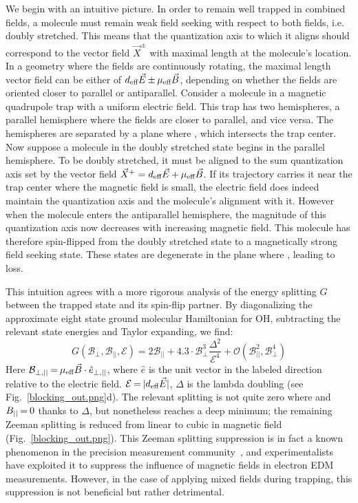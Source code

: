 \documentclass[defaultstyle,11pt]{thesis}
\begin{document}
We begin with an intuitive picture.
In order to remain well trapped in combined fields, a molecule must remain weak field seeking with respect to both fields, i.e. doubly stretched.
This means that the quantization axis to which it aligns should correspond to the vector field $\vec{X}^{\pm}$ with maximal length at the molecule's location.
In a geometry where the fields are continuously rotating, the maximal length vector field can be either of $d_\text{eff}\vec{E} {\nobreak\hspace{.2em}} {\pm}{\nobreak\hspace{.2em}}  \mu_\text{eff}\vec{B}$, depending on whether the fields are oriented closer to parallel or antiparallel.
Consider a molecule in a magnetic quadrupole trap with a uniform electric field.
This trap has two hemispheres, a parallel hemisphere where the fields are closer to parallel, and vice versa.
The hemispheres are separated by a plane where \epb{}, which intersects the trap center.
Now suppose a molecule in the doubly stretched state begins in the parallel hemisphere.
To be doubly stretched, it must be aligned to the sum quantization axis set by the vector field $\vec{X}^{+} = d_\text{eff}\vec{E} {\nobreak\hspace{.2em}} {+}{\nobreak\hspace{.2em}}  \mu_\text{eff}\vec{B}$.
If its trajectory carries it near the trap center where the magnetic field is small, the electric field does indeed maintain the quantization axis and the molecule's alignment with it.
However when the molecule enters the antiparallel hemisphere, the magnitude of this quantization axis now decreases with increasing magnetic field. This molecule has therefore spin-flipped from the doubly stretched state to a magnetically strong field seeking state. These states are degenerate in the plane where \epb{}, leading to loss.

This intuition agrees with a more rigorous analysis of the energy splitting $G$ between the trapped state and its spin-flip partner.
By diagonalizing the approximate eight state ground molecular Hamiltonian for OH, subtracting the relevant state energies and Taylor expanding, we find:
\begin{equation}
\label{eqn:energetics}
G(\mathcal{B}_\perp,\mathcal{B}_{||},\mathcal{E}) = 2\mathcal{B}_{||} + 4.3\!\cdot\!\mathcal{B}_\perp^3\frac{\Delta^2}{\mathcal{E}^4} + \mathcal{O}(\mathcal{B}_{||}^2,\mathcal{B}_\perp^4)
\end{equation}
Here $\mathcal{B}_{\perp,||}{\nobreak\hspace{.2em}} {=}{\nobreak\hspace{.2em}}\mu_\text{eff}\vec{B}\cdot\hat{e}_{\perp,||}$, where $\hat{e}$ is the unit vector in the labeled direction relative to the electric field.
$\mathcal{E}{\nobreak\hspace{.2em}} {=}{\nobreak\hspace{.2em}} |d_\text{eff}\vec{E}|$, $\Delta$ is the lambda doubling (see Fig.~\ref{blocking_out.png}d).
The relevant splitting is not quite zero where \epb{} and $B_{||}{\nobreak\hspace{.2em}} {=}{\nobreak\hspace{.2em}} 0$ thanks to $\Delta$, but nonetheless reaches a deep minimum; the remaining Zeeman splitting is reduced from linear to cubic in magnetic field (Fig.~\ref{blocking_out.png}).
This Zeeman splitting suppression is in fact a known phenomenon in the precision measurement community~\cite{Player1970,Hudson2002},
and experimentalists have exploited it to suppress the influence of magnetic fields in electron EDM measurements.
However, in the case of applying mixed fields during trapping, this suppression is not beneficial but rather detrimental.
\end{document}
